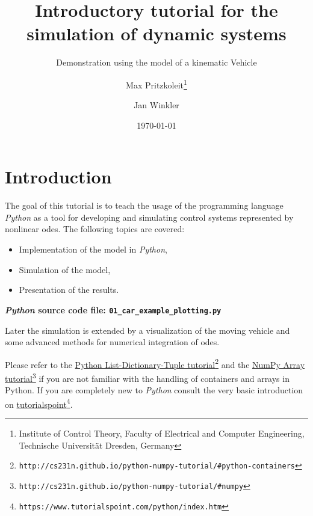\documentclass[a4paper,11pt,headinclude=true,headsepline,parskip=half,DIV=13]{scrartcl}
\title{Introductory tutorial for the simulation of dynamic systems}
\subtitle{Demonstration using the model of a kinematic Vehicle}
\author{Max Pritzkoleit\thanks{Institute of Control Theory, Faculty of Electrical and Computer Engineering, Technische Universität Dresden, Germany} \and Jan Winkler\footnotemark[1]}
\date{\today}
\newcommand{\py}{\emph{Python}\xspace}
\newcommand{\code}[1]{\lstinline[basicstyle=\normalsize\ttfamily]{#1}}
\begin{document}
\maketitle




\tableofcontents

\newpage

\section{Introduction}
The goal of this tutorial is to teach the usage of the programming language \py as a tool for developing and simulating control systems  represented by nonlinear \glspl{ode}. The following topics are covered:
\begin{itemize}
\item Implementation of the model in \py,
\item Simulation of the model,
\item Presentation of the results.
\end{itemize}
\textbf{\py source code file: \texttt{01\_car\_example\_plotting.py}}

Later the simulation is extended by a visualization of the moving vehicle and some advanced methods for numerical integration of \glspl{ode}.

Please refer to the \href{http://cs231n.github.io/python-numpy-tutorial/#python-containers}{Python List-Dictionary-Tuple tutorial}\footnote{\code{http://cs231n.github.io/python-numpy-tutorial/#python-containers}} and the \href{http://cs231n.github.io/python-numpy-tutorial/#numpy}{NumPy Array tutorial}\footnote{\code{http://cs231n.github.io/python-numpy-tutorial/#numpy}} if you are not familiar with the handling of containers and arrays in Python. If you are completely new to \py consult the very basic introduction on \href{https://www.tutorialspoint.com/python/index.htm}{tutorialspoint}\footnote{\code{https://www.tutorialspoint.com/python/index.htm}}.
\end{document}
